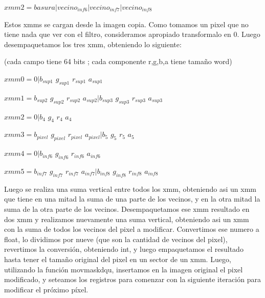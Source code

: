 \documentclass[a4paper]{article}
\begin{document}
$xmm2=  basura|vecino_{inf6}|vecino_{inf7}|vecino_{inf8}$

\vspace*{0.3cm}

Estos xmms se cargan desde la imagen copia. Como tomamos un pixel que no tiene nada que ver con el filtro, consideramos apropiado transformalo en 0. Luego desempaquetamos los tres xmm, obteniendo lo siguiente:

\vspace*{0.3cm}

(cada campo tiene 64 bits ; cada componente r,g,b,a tiene tamaño word)

\vspace*{0.3cm}
$xmm0=  0|b_{sup1}$ $g_{sup1}$ $r_{sup1}$ $a_{sup1}$ 

\vspace*{0.3cm}

$xmm1=  b_{sup2}$ $g_{sup2}$ $r_{sup2}$ $a_{sup2}|b_{sup3}$ $g_{sup3}$ $r_{sup3}$ $a_{sup3}$  

\vspace*{0.3cm}

$xmm2=  0         |b_{4}$ $g_{4}$ $r_{4}$ $a_{4}$

\vspace*{0.3cm}

$xmm3=  b_{pixel}$ $g_{pixel}$ $r_{pixel}$ $a_{pixel}     |b_{5}$ $g_{5}$ $r_{5}$ $a_{5}$

\vspace*{0.3cm}

$xmm4=  0         |b_{inf6}$ $g_{inf6}$ $r_{inf6}$ $a_{inf6} $ 

\vspace*{0.3cm}

$xmm5=  b_{inf7}$ $g_{inf7}$ $r_{inf7}$ $a_{inf7}|b_{inf8}$ $g_{inf8}$ $r_{inf8}$ $a_{inf8}$

\vspace*{0.3cm}

Luego se realiza una suma vertical entre todos los xmm, obteniendo asi un xmm que tiene en una mitad la suma de una parte de los vecinos, y en la otra mitad la suma de la otra parte de los vecinos. Desempaquetamos ese xmm resultado en dos xmm y realizamos nuevamente una suma vertical, obteniendo asi un xmm con la suma de todos los vecinos del pixel a modificar. Convertimos ese numero a float, lo dividimos por nueve (que son la cantidad de vecinos del pixel), revertimos la conversión, obteniendo int, y luego empaquetamos el resultado hasta tener el tamaño original del pixel en un sector de un xmm. Luego, utilizando la función movmaskdqu, insertamos en la imagen original el pixel modificado, y seteamos los registros para comenzar con la siguiente iteración para modificar el próximo píxel.  
\end{document}
